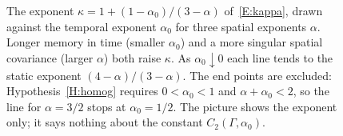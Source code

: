 \begin{figure}[htbp]
  \centering
  
  \caption[The exponent $\kappa$ against the temporal exponent]{The exponent
    $\kappa=1+(1-\alpha_0)/(3-\alpha)$ of~\eqref{E:kappa}, drawn against the
    temporal exponent $\alpha_0$ for three spatial exponents $\alpha$. Longer
    memory in time (smaller $\alpha_0$) and a more singular spatial covariance
    (larger $\alpha$) both raise $\kappa$. As $\alpha_0\downarrow0$ each line
    tends to the static exponent $(4-\alpha)/(3-\alpha)$. The end points are
    excluded: Hypothesis~\ref{H:homog} requires $0<\alpha_0<1$ and
    $\alpha+\alpha_0<2$, so the line for $\alpha=3/2$ stops at $\alpha_0=1/2$.
    The picture shows the exponent only; it says nothing about the constant
    $C_2(\Gamma,\alpha_0)$.}
  \label{Fig:kappa-fan}
\end{figure}
